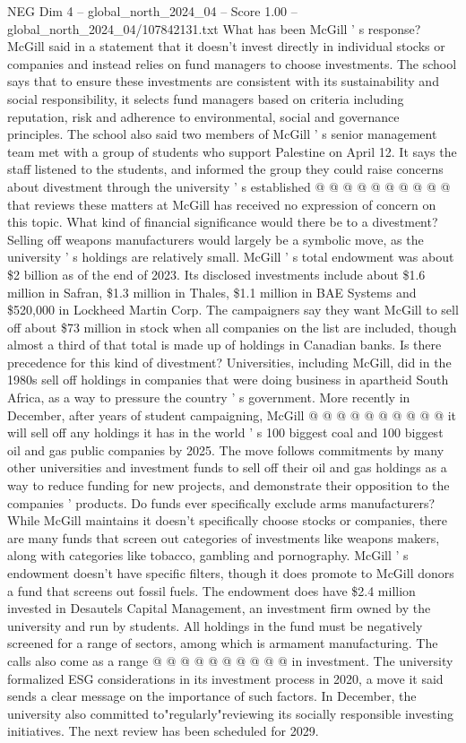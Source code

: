 \begin{textsample}{NEG Dim 4 – global\_north\_2024\_04 – Score 1.00 – global\_north\_2024\_04/107842131.txt}
What has been McGill ' s response?
McGill said in a statement that it doesn't invest directly in individual stocks or companies and instead relies on fund managers to choose investments.
The school says that to ensure these investments are consistent with its sustainability and social responsibility, it selects fund managers based on criteria including reputation, risk and adherence to environmental, social and governance principles.
The school also said two members of McGill ' s senior management team met with a group of students who support Palestine on April 12.
It says the staff listened to the students, and informed the group they could raise concerns about divestment through the university ' s established @ @ @ @ @ @ @ @ @ @ that reviews these matters at McGill has received no expression of concern on this topic.
What kind of financial significance would there be to a divestment?
Selling off weapons manufacturers would largely be a symbolic move, as the university ' s holdings are relatively small.
McGill ' s total endowment was about \$2 billion as of the end of 2023.
Its disclosed investments include about \$1.6 million in Safran, \$1.3 million in Thales, \$1.1 million in BAE Systems and \$520,000 in Lockheed Martin Corp.
The campaigners say they want McGill to sell off about \$73 million in stock when all companies on the list are included, though almost a third of that total is made up of holdings in Canadian banks.
Is there precedence for this kind of divestment?
Universities, including McGill, did in the 1980s sell off holdings in companies that were doing business in apartheid South Africa, as a way to pressure the country ' s government.
More recently in December, after years of student campaigning, McGill @ @ @ @ @ @ @ @ @ @ it will sell off any holdings it has in the world ' s 100 biggest coal and 100 biggest oil and gas public companies by 2025.
The move follows commitments by many other universities and investment funds to sell off their oil and gas holdings as a way to reduce funding for new projects, and demonstrate their opposition to the companies ' products.
Do funds ever specifically exclude arms manufacturers?
While McGill maintains it doesn't specifically choose stocks or companies, there are many funds that screen out categories of investments like weapons makers, along with categories like tobacco, gambling and pornography.
McGill ' s endowment doesn't have specific filters, though it does promote to McGill donors a fund that screens out fossil fuels.
The endowment does have \$2.4 million invested in Desautels Capital Management, an investment firm owned by the university and run by students.
All holdings in the fund must be negatively screened for a range of sectors, among which is armament manufacturing.
The calls also come as a range @ @ @ @ @ @ @ @ @ @ in investment.
The university formalized ESG considerations in its investment process in 2020, a move it said sends a clear message on the importance of such factors.
In December, the university also committed to"regularly"reviewing its socially responsible investing initiatives.
The next review has been scheduled for 2029.

\end{textsample}
